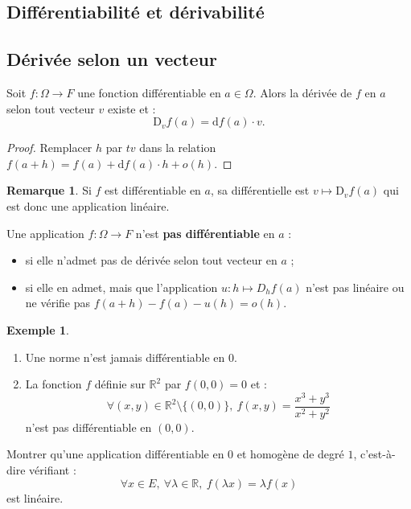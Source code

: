 \documentclass[french]{article}
\newcommand{\R}{\mathbb{R}}
\renewcommand{\d}{\text{d}}
\newcommand{\D}{\text{D}}
\theoremstyle{plain}
\theoremstyle{definition}
\newtheorem*{ex}{Exemple}
\newtheorem*{rmq}{Remarque}
\theoremstyle{remark}
\begin{document}
\subsection{Différentiabilité et dérivabilité}

\subsection{Dérivée selon un vecteur}

\begin{prop}%
	Soit $f:\Omega\to F$ une fonction différentiable en $a\in\Omega$. Alors la dérivée de $f$ en $a$ selon tout vecteur $v$ existe et :
	$$\D_vf(a)=\d f(a)\cdot v.$$
\end{prop}
\begin{proof}
	Remplacer $h$ par $tv$ dans la relation $f(a+h)=f(a)+\d f(a)\cdot h+o(h)$.
\end{proof}

\begin{rmq}
	Si $f$ est différentiable en $a$, sa différentielle est $v\mapsto \D_vf(a)$ qui est donc une application linéaire.
\end{rmq}

\begin{met}
	Une application $f:\Omega\to F$ n'est \textbf{pas différentiable} en $a$ :
	\begin{itemize}
		\item si elle n'admet pas de dérivée selon tout vecteur en $a$ ;
		\item si elle en admet, mais que l'application $u:h\mapsto D_hf(a)$ n'est pas linéaire ou ne vérifie pas $f(a+h)-f(a)-u(h)=o(h)$.
	\end{itemize}
\end{met}

\begin{ex}
	\begin{enumerate}
		\item Une norme n'est jamais différentiable en $0$. %
		\item La fonction $f$ définie sur $\R^2$ par $f(0,0)=0$ et :
		$$\forall (x,y)\in\R^2\setminus\{(0,0)\},\ f(x,y)=\frac{x^3+y^3}{x^2+y^2}$$ n'est pas différentiable en $(0,0)$.
	\end{enumerate}
\end{ex}

\begin{exo}
	Montrer qu'une application différentiable en $0$ et homogène de degré $1$, c'est-à-dire vérifiant : 
	$$\forall x\in E,\ \forall\lambda\in\R,\ f(\lambda x)=\lambda f(x)$$ est linéaire.
\end{exo}
\end{document}

